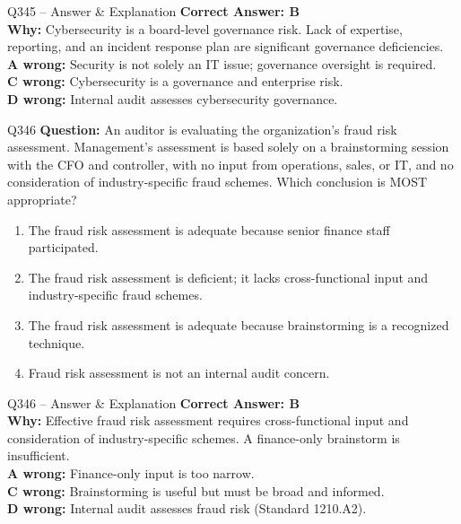 \documentclass[aspectratio=169,10pt]{beamer}
\begin{document}
	\begin{frame}[t]{Q345 -- Answer \& Explanation}
		\small
		\textbf{Correct Answer: B} \\[4pt]
		\textbf{Why:} Cybersecurity is a board-level governance risk. Lack of expertise, reporting, and an incident response plan are significant governance deficiencies. \\[4pt]
		\textbf{A wrong:} Security is not solely an IT issue; governance oversight is required. \\[2pt]
		\textbf{C wrong:} Cybersecurity is a governance and enterprise risk. \\[2pt]
		\textbf{D wrong:} Internal audit assesses cybersecurity governance.
	\end{frame}
	
	\begin{frame}[t]{Q346}
		\small
		\textbf{Question:} An auditor is evaluating the organization's fraud risk assessment. Management's assessment is based solely on a brainstorming session with the CFO and controller, with no input from operations, sales, or IT, and no consideration of industry-specific fraud schemes. Which conclusion is MOST appropriate?
		\begin{enumerate}[label=\Alph*.,itemsep=1pt,topsep=2pt]
			\item The fraud risk assessment is adequate because senior finance staff participated.
			\item The fraud risk assessment is deficient; it lacks cross-functional input and industry-specific fraud schemes.
			\item The fraud risk assessment is adequate because brainstorming is a recognized technique.
			\item Fraud risk assessment is not an internal audit concern.
		\end{enumerate}
	\end{frame}
	
	\begin{frame}[t]{Q346 -- Answer \& Explanation}
		\small
		\textbf{Correct Answer: B} \\[4pt]
		\textbf{Why:} Effective fraud risk assessment requires cross-functional input and consideration of industry-specific schemes. A finance-only brainstorm is insufficient. \\[4pt]
		\textbf{A wrong:} Finance-only input is too narrow. \\[2pt]
		\textbf{C wrong:} Brainstorming is useful but must be broad and informed. \\[2pt]
		\textbf{D wrong:} Internal audit assesses fraud risk (Standard 1210.A2).
	\end{frame}
	
\end{document}
